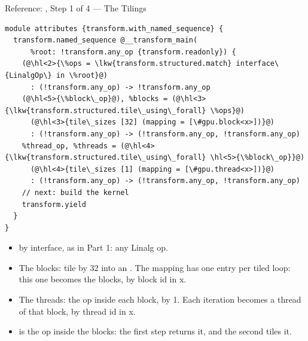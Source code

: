\documentclass[aspectratio=169,10pt]{beamer}
\begin{document}
\begin{frame}[fragile]{Reference: , Step 1 of 4 --- The Tilings}
\begin{lstlisting}[language=mlir]
module attributes {transform.with_named_sequence} {
  transform.named_sequence @__transform_main(
      %root: !transform.any_op {transform.readonly}) {
    (@\hl<2>{\%ops = \lkw{transform.structured.match} interface\{LinalgOp\} in \%root}@)
      : (!transform.any_op) -> !transform.any_op
    (@\hl<5>{\%block\_op}@), %blocks = (@\hl<3>{\lkw{transform.structured.tile\_using\_forall} \%ops}@)
      (@\hl<3>{tile\_sizes [32] (mapping = [\#gpu.block<x>])}@)
      : (!transform.any_op) -> (!transform.any_op, !transform.any_op)
    %thread_op, %threads = (@\hl<4>{\lkw{transform.structured.tile\_using\_forall} \hl<5>{\%block\_op}}@)
      (@\hl<4>{tile\_sizes [1] (mapping = [\#gpu.thread<x>])}@)
      : (!transform.any_op) -> (!transform.any_op, !transform.any_op)
    // next: build the kernel
    transform.yield
  }
}
\end{lstlisting}
  \vspace{0.3em}
  \begin{itemize}
    \item<2->  by interface, as in Part 1: any Linalg op.
    \item<3-> The blocks: tile  by 32 into an . The
      mapping has one entry per tiled loop: this one becomes the blocks, by
      block id in x.
    \item<4-> The threads: the op inside each block, by 1. Each iteration
      becomes a thread of that block, by thread id in x.
    \item<5->  is the op inside the blocks: the first step
      returns it, and the second tiles it.
  \end{itemize}
\end{frame}
\end{document}

